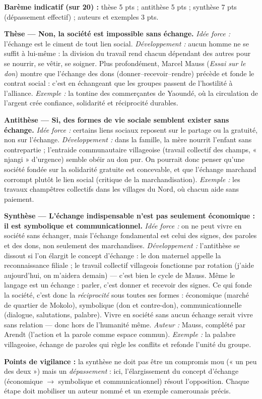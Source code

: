 \documentclass[11pt]{article}
\begin{document}
\begin{corrige}
\textbf{Barème indicatif (sur 20) :} thèse 5 pts ; antithèse 5 pts ; synthèse 7 pts (dépassement effectif) ; auteurs et exemples 3 pts.

\textbf{Thèse — Non, la société est impossible sans échange.}
\emph{Idée force :} l'échange est le ciment de tout lien social. \emph{Développement :} aucun homme ne se suffit à lui-même : la division du travail rend chacun dépendant des autres pour se nourrir, se vêtir, se soigner. Plus profondément, Marcel Mauss (\emph{Essai sur le don}) montre que l'échange des dons (donner--recevoir--rendre) précède et fonde le contrat social : c'est en échangeant que les groupes passent de l'hostilité à l'alliance. \emph{Exemple :} la tontine des commerçantes de Yaoundé, où la circulation de l'argent crée confiance, solidarité et réciprocité durables.

\textbf{Antithèse — Si, des formes de vie sociale semblent exister sans échange.}
\emph{Idée force :} certains liens sociaux reposent sur le partage ou la gratuité, non sur l'échange. \emph{Développement :} dans la famille, la mère nourrit l'enfant sans contrepartie ; l'entraide communautaire villageoise (travail collectif des champs, « njangi » d'urgence) semble obéir au don pur. On pourrait donc penser qu'une société fondée sur la solidarité gratuite est concevable, et que l'échange marchand corrompt plutôt le lien social (critique de la marchandisation). \emph{Exemple :} les travaux champêtres collectifs dans les villages du Nord, où chacun aide sans paiement.

\textbf{Synthèse — L'échange indispensable n'est pas seulement économique : il est symbolique et communicationnel.}
\emph{Idée force :} on ne peut vivre en société sans échanger, mais l'échange fondamental est celui des signes, des paroles et des dons, non seulement des marchandises. \emph{Développement :} l'antithèse se dissout si l'on élargit le concept d'échange : le don maternel appelle la reconnaissance filiale ; le travail collectif villageois fonctionne par rotation (j'aide aujourd'hui, on m'aidera demain) — c'est bien le cycle de Mauss. Même le langage est un échange : parler, c'est donner et recevoir des signes. Ce qui fonde la société, c'est donc la \emph{réciprocité} sous toutes ses formes : économique (marché de quartier de Mokolo), symbolique (don et contre-don), communicationnelle (dialogue, salutations, palabre). Vivre en société sans aucun échange serait vivre sans relation — donc hors de l'humanité même. \emph{Auteur :} Mauss, complété par Arendt (l'action et la parole comme espace commun). \emph{Exemple :} la palabre villageoise, échange de paroles qui règle les conflits et refonde l'unité du groupe.

\textbf{Points de vigilance :} la synthèse ne doit pas être un compromis mou (« un peu des deux ») mais un \emph{dépassement} : ici, l'élargissement du concept d'échange (économique $\rightarrow$ symbolique et communicationnel) résout l'opposition. Chaque étape doit mobiliser un auteur nommé et un exemple camerounais précis.
\end{corrige}
\end{document}
